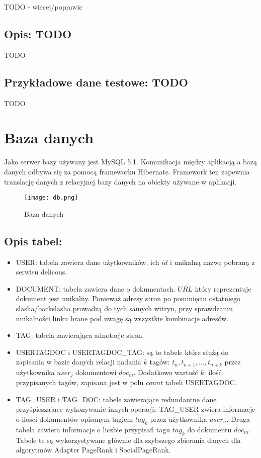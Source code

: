 TODO - wiecej/poprawic


\subsection * {Opis: TODO}
TODO

\subsection*{Przykładowe dane testowe: TODO}



TODO
\section{Baza danych}

Jako serwer bazy używany jest MySQL 5.1. Komunikacja między aplikacją a bazą danych odbywa się za pomocą frameworku Hibernate. Framework ten zapewnia translację danych z relacyjnej bazy danych na obiekty używane w aplikacji. 


\begin{figure}[h]
\centering
\texttt{[image: db.png]}
\caption{Baza danych}
\label{fig:db_fig}
\end{figure}


\subsection*{Opis tabel:}
\begin{itemize}
	\item USER: tabela zawiera dane użytkowników, ich $id$ i unikalną nazwę pobraną z serwisu delicous.
	\item DOCUMENT: tabela zawiera dane o dokumentach. $URL$ który reprezentuje dokument jest unikalny. Ponieważ adresy stron po pominięciu ostatniego slasha/backslasha prowadzą do tych samych witryn, przy sprawdzaniu unikalności linku brane pod uwagę są wszystkie kombinacje adresów.
	\item TAG: tabela zawierająca adnotacje stron.
	\item USERTAGDOC i USERTAGDOC\_TAG: są to tabele które służą do zapisania w bazie danych relacji nadania $k$ tagów: $t_n, t_{n+1}, \dots, t_{n+k}$ przez użytkownika $user_j$  dokumentowi $doc_m$. Dodatkowo wartość $k$: ilość przypisanych tagów, zapisana jest w polu $count$ tabeli USERTAGDOC.
	\item TAG\_USER i TAG\_DOC: tabele zawierające redundantne dane przyśpieszające wykonywanie innych operacji. TAG\_USER zwiera informacje o ilości dokumentów opisanym tagiem $tag_k$ przez użytkownika $user_n$. Druga tabela zawiera informacje o liczbie przypisań tagu $tag_k$ do dokumentu $doc_m$. Tabele te są wykorzystywane głównie dla szybszego zbierania danych dla algorytmów Adapter PageRank i SocialPageRank.
\end{itemize}





